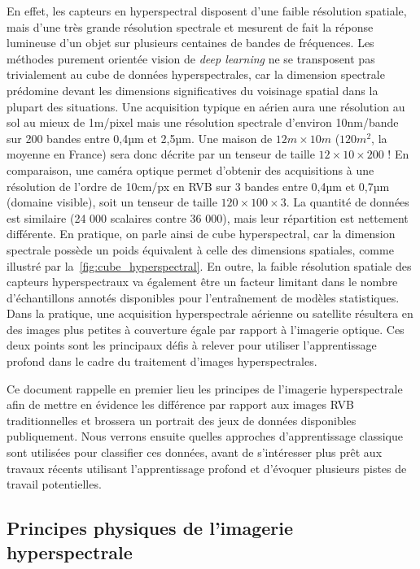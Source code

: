 En effet, les capteurs en hyperspectral disposent d'une faible résolution spatiale, mais d'une très grande résolution spectrale et mesurent de fait la réponse lumineuse d'un objet sur plusieurs centaines de bandes de fréquences. Les méthodes purement orientée vision de \textit{deep learning} ne se transposent pas trivialement au cube de données hyperspectrales, car la dimension spectrale prédomine devant les dimensions significatives du voisinage spatial dans la plupart des situations. Une acquisition typique en aérien aura une résolution au sol au mieux de 1m/pixel mais une résolution spectrale d'environ 10nm/bande sur 200 bandes entre 0,4µm et 2,5µm. Une maison de $12m\times10m$ ($120m^2$, la moyenne en France) sera donc décrite par un tenseur de taille $12\times10\times200$ ! En comparaison, une caméra optique permet d'obtenir des acquisitions à une résolution de l'ordre de 10cm/px en RVB sur 3 bandes entre 0,4µm et 0,7µm (domaine visible), soit un tenseur de taille $120\times100\times3$. La quantité de données est similaire (24 000 scalaires contre 36 000), mais leur répartition est nettement différente. En pratique, on parle ainsi de cube hyperspectral, car la dimension spectrale possède un poids équivalent à celle des dimensions spatiales, comme illustré par la~\cref{fig:cube_hyperspectral}. En outre, la faible résolution spatiale des capteurs hyperspectraux va également être un facteur limitant dans le nombre d'échantillons annotés disponibles pour l'entraînement de modèles statistiques. Dans la pratique, une acquisition hyperspectrale aérienne ou satellite résultera en des images plus petites à couverture égale par rapport à l'imagerie optique. Ces deux points sont les principaux défis à relever pour utiliser l'apprentissage profond dans le cadre du traitement d'images hyperspectrales.

Ce document rappelle en premier lieu les principes de l'imagerie hyperspectrale afin de mettre en évidence les différence par rapport aux images RVB traditionnelles et brossera un portrait des jeux de données disponibles publiquement. Nous verrons ensuite quelles approches d'apprentissage classique sont utilisées pour classifier ces données, avant de s'intéresser plus prêt aux travaux récents utilisant l'apprentissage profond et d'évoquer plusieurs pistes de travail potentielles.

\subsection{Principes physiques de l'imagerie hyperspectrale}

